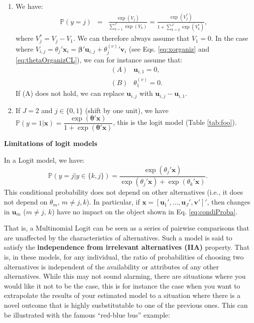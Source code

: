 \documentclass[
  12pt,
]{book}
\providecommand{\tightlist}{%
  \setlength{\itemsep}{0pt}\setlength{\parskip}{0pt}}
\theoremstyle{definition}
\theoremstyle{definition}
\theoremstyle{definition}
\theoremstyle{definition}
\theoremstyle{remark}
\begin{document}
\begin{enumerate}
\def\labelenumi{\arabic{enumi}.}
\tightlist
\item
  We have:
  \begin{eqnarray*}
  \mathbb{P}(y=j) &=& \frac{\exp(V_j)}{\sum_{k=1}^J \exp(V_k)}= \frac{\exp(V^*_j)}{1 + \sum_{k=2}^J \exp(V^*_k)},
  \end{eqnarray*}
  where \(V^*_j = V_j - V_1\). We can therefore always assume that \(V_{1}=0\). In the case where \(V_{i,j} = \theta_j'\mathbf{x}_i = \boldsymbol\beta'\mathbf{u}_{i,j}+{\theta_j^{(v)}}'\mathbf{v}_i\) (see Eqs. \eqref{eq:xorganiz} and \eqref{eq:thetaOrganizCL}), we can for instance assume that:
  \begin{eqnarray*}
  &(A)& \mathbf{u}_{i,1}=0,\\
  &(B)& \theta_1^{(v)} = 0.
  \end{eqnarray*}
  If (A) does not hold, we can replace \(\mathbf{u}_{i,j}\) with \(\mathbf{u}_{i,j}-\mathbf{u}_{i,1}\).
\item
  If \(J=2\) and \(j \in \{0,1\}\) (shift by one unit), we have \(\mathbb{P}(y=1|\mathbf{x})=\dfrac{\exp(\boldsymbol\theta'\mathbf{x})}{1+\exp(\boldsymbol\theta'\mathbf{x})}\), this is the logit model (Table \ref{tab:foo}).
\end{enumerate}

\textbf{Limitations of logit models}

In a Logit model, we have:
\begin{equation}
\mathbb{P}(y=j|y \in \{k,j\}) = \frac{\exp(\theta_j'\mathbf{x})}{\exp(\theta_j'\mathbf{x}) + \exp(\theta_k'\mathbf{x})}.\label{eq:condiProba}
\end{equation}
This conditional probability does not depend on other alternatives (i.e., it does not depend on \(\theta_m\), \(m \ne j,k\)). In particular, if \(\mathbf{x} = [\mathbf{u}_1',\dots,\mathbf{u}_J',\mathbf{v}']'\), then changes in \(\mathbf{u}_m\) (\(m \ne j,\,k\)) have no impact on the object shown in Eq. \eqref{eq:condiProba}.

That is, a Multinomial Logit can be seen as a series of pairwise comparisons that are unaffected by the characteristics of alternatives. Such a model is said to satisfy the \textbf{independence from irrelevant alternatives (IIA)} property. That is, in these models, for any individual, the ratio of probabilities of choosing two alternatives is independent of the availability or attributes of any other alternatives. While this may not sound alarming, there are situations where you would like it not to be the case, this is for instance the case when you want to extrapolate the results of your estimated model to a situation where there is a novel outcome that is highly susbstitutable to one of the previous ones. This can be illustrated with the famous ``red-blue bus'' example:
\end{document}
